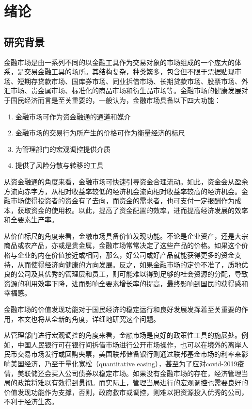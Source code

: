 \documentclass[twoside,longtitle]{LZUthesis}
\begin{document}
\tableofcontents{}

\mainmatter

\pagestyle{lzu}


\chapter{绪论}

\section{研究背景}
金融市场\cite{hesengming1990}是由一系列不同的以金融工具作为交易对象的市场组成的一个庞大的体系，是交易金融工具的场所。其结构复杂，种类繁多，包含但不限于票据贴现市场、短期存贷款市场、国库券市场、同业拆借市场、长期贷款市场、股票市场、外汇市场、贵金属市场、标准化的商品市场和衍生品市场等。金融市场的健康发展对于国民经济而言是至关重要的，一般认为，金融市场具备以下四大功能\cite{mishkin2007}\cite{zhangyichun2002}：
\begin{enumerate}
    \item 金融市场可作为资金融通的通道和媒介
    \item 金融市场的交易行为所产生的价格可作为衡量经济的标尺
    \item 为管理部门的宏观调控提供介质
    \item 提供了风险分散与转移的工具
\end{enumerate}

从资金融通的角度来看，金融市场可快速引导资金合理流动。如此，资金会从盈余方流向赤字方，从相对收益率较低的经济机会流向相对收益率较高的经济机会。金融市场使得投资者的资金有了去向，而资金的需求者，也可支付一定报酬作为成本，获取资金的使用权。以此，提高了资金配置的效率，进而提高经济发展的效率和全要素生产率。

从价值标尺的角度来看，金融市场具备价值发现功能。不论是企业资产，还是大宗商品或农产品，亦或是贵金属，金融市场常常决定了这些产品的价格。如果这个价格与企业的内在价值接近或相同，那么，好公司或好产品就能获得更多的资金支持，从而使得经济向健康的方向发展。反之，如果金融市场的定价不准了，质地优良的公司及其优秀的管理层和员工，则可能难以得到足够的社会资源的分配，导致资源的利用效率下降，进而影响全要素增长率的提高，最终影响到国民的获得感和幸福感。

金融市场的价值发现功能对于国民经济的稳定运行和良好发展发挥着至关重要的作用，本文也将从全新的角度，详细地研究这个问题。

从管理部门进行宏观调控的角度来看，金融市场是良好的政策性工具的施展处。例如，中国人民银行可在银行间拆借市场进行公开市场操作，也可以在境外的离岸人民币交易市场发行或回购央票，美国联邦储备银行则通过联邦基金市场的利率来影响美国经济，乃至于量化宽松（quantitative easing），甚至为了应对covid-2019疫情，美联储还会买入公司债券以稳定市场。如果没有金融市场的存在，经济管理当局的政策将难以有效得到贯彻。而实际上，管理当局进行的宏观调控也需要良好的价值发现功能作为支撑，否则，政府救市或调控，则难以把资源投入优秀的公司，不利于经济生态。
\end{document}
